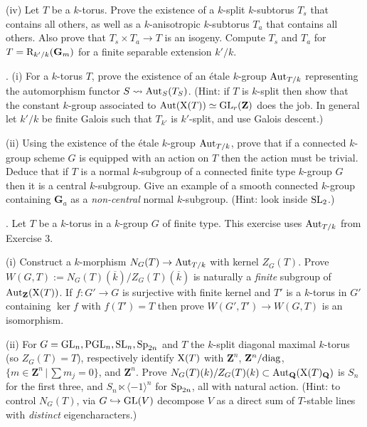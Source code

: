 \documentclass[10pt]{amsart}
\begin{document}
(iv)  Let $T$ be a $k$-torus.  Prove the existence of a $k$-split $k$-subtorus $T_s$ that contains all others, as well as
a $k$-anisotropic $k$-subtorus $T_a$ that contains all others.  Also prove that $T_s \times T_a \rightarrow T$ is an isogeny.
Compute $T_s$ and $T_a$ for $T = {\rm{R}}_{k'/k}(\mathbf{G}_m)$ for a finite separable extension $k'/k$.

\medskip{}. (i) For a $k$-torus $T$,
prove the existence of an \'etale $k$-group ${\rm{Aut}}_{T/k}$
representing the automorphism functor $S \rightsquigarrow
 {\rm{Aut}}_S(T_S)$.  (Hint:  if $T$ is $k$-split then
show that the constant $k$-group associated to ${\rm{Aut}}({\rm{X}}(T)) \simeq {\rm{GL}}_r(\mathbf{Z})$ does the job.
In general let $k'/k$ be finite Galois such that $T_{k'}$ is $k'$-split, and use Galois descent.)

(ii) Using the existence of the \'etale $k$-group ${\rm{Aut}}_{T/k}$, prove that if a connected $k$-group scheme
$G$ is equipped with an action on $T$ then the action must be trivial.  Deduce that if $T$ is a normal $k$-subgroup of
a connected finite type $k$-group $G$ then it is a central $k$-subgroup.  
Give an example of a smooth connected $k$-group containing $\mathbf{G}_a$ as a {\em non-central} normal $k$-subgroup.
(Hint: look inside ${\rm{SL}}_2$.) 

\medskip{}. Let $T$ be a $k$-torus in a $k$-group $G$ of finite type.  This exercise uses ${\rm{Aut}}_{T/k}$ from Exercise 3. 

(i) Construct a $k$-morphism $N_G(T) \rightarrow {\rm{Aut}}_{T/k}$ with kernel $Z_G(T)$.
Prove $W(G,T) := 
N_G(T)(\overline{k})/Z_G(T)(\overline{k})$ is naturally a {\em finite} subgroup of
${\rm{Aut}}_{\mathbf{Z}}({\rm{X}}(T))$.  If $f:G' \rightarrow G$ is surjective with finite kernel and $T'$ is a $k$-torus in 
$G'$ containing $\ker f$ with $f(T') = T$ then prove 
$W(G',T') \rightarrow W(G,T)$ is an isomorphism. 

(ii) For $G = {\rm{GL}}_n, {\rm{PGL}}_n, {\rm{SL}}_n, {\rm{Sp}}_{2n}$ and $T$ the $k$-split diagonal maximal $k$-torus
(so $Z_G(T) = T$), respectively identify
${\rm{X}}(T)$ with $\mathbf{Z}^n$, $\mathbf{Z}^n/{\rm{diag}}$, $\{m \in \mathbf{Z}^n\,|\,\sum m_j = 0\}$,
and $\mathbf{Z}^n$.  Prove $N_G(T)(k)/Z_G(T)(k) \subset
{\rm{Aut}}_{\mathbf{Q}}({\rm{X}}(T)_{\mathbf{Q}})$ is $S_n$ for the first three, and
$S_n \ltimes \langle -1 \rangle^n$ for ${\rm{Sp}}_{2n}$, all with natural action. 
(Hint: to control $N_G(T)$, via 
$G \hookrightarrow {\rm{GL}}(V)$ decompose $V$ as a direct sum of
$T$-stable lines with {\em distinct} eigencharacters.)
\end{document}
